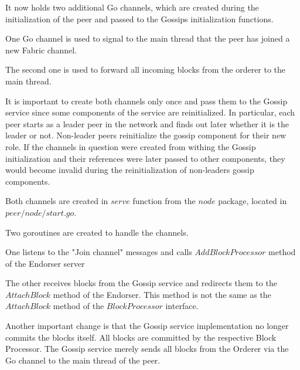It now holds two additional Go channels, which are created during the initialization of the peer and passed to the Gossips initialization functions.

One Go channel is used to signal to the main thread that the peer has joined a new Fabric channel.

The second one is used to forward all incoming blocks from the orderer to the main thread.

It is important to create both channels only once and pass them to the Gossip service since some components of the service are reinitialized. In particular, each peer starts as a leader peer in the network and finds out later whether it is the leader or not. Non-leader peers reinitialize the gossip component for their new role. If the channels in question were created from withing the Gossip initialization and their references were later passed to other components, they would become invalid during the reinitialization of non-leaders gossip components.

Both channels are created in $serve$ function from the $node$ package, located in $peer/node/start.go$.

Two goroutines are created to handle the channels.

One listens to the "Join channel" messages and calls $AddBlockProcessor$ method of the Endorser server

The other receives blocks from the Gossip service and redirects them to the $AttachBlock$ method of the Endorser. This method is not the same as the $AttachBlock$ method of the $BlockProcessor$ interface.

Another important change is that the Gossip service implementation no longer commits the blocks itself. All blocks are committed by the respective Block Processor. The Gossip service merely sends all blocks from the Orderer via the Go channel to the main thread of the peer.
